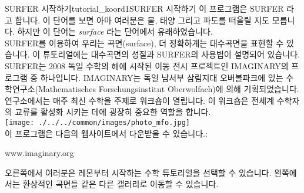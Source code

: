\begin{surferIntroPage}{SURFER 시작하기}{tutorial_koord1}{SURFER 시작하기}
이 프로그램은 SURFER 라고 합니다. 이 단어를 보면 아마 여러분은 물, 태양 그리고 파도를 떠올릴 지도 모릅니다. 하지만 이 단어는 {\it surface} 라는 단어에서 유래하였습니다.
\\
SURFER를 이용하여 우리는 곡면(surface), 더 정확하게는 대수곡면을 표현할 수 있습니다. 
이 튜토리얼에는 대수곡면의 성질과 SURFER의 사용법이 설명되어 있습니다.\\
SURFER는 2008 독일 수학의 해에 시작된 이동 전시 프로젝트인 IMAGINARY의 프로그램 중 하나입니다. IMAGINARY는 독일 남서부 삼림지대 오버볼파크에 있는 수학연구소(Mathematisches Forschungsinstitut Oberwolfach)에 의해 기획되었습니다. 연구소에서는 매주 최신 수학을 주제로 워크숍이 열립니다. 이 워크숍은 전세계 수학자의 교류를 활성화 시키는 데에 굉장히 중요한 역할을 합니다.\\
\vspace{0.2cm} \hspace{3.5cm}\texttt{[image: ./../../common/images/photo\_mfo.jpg]}\\
이 프로그램은 다음의 웹사이트에서 다운받을 수 있습니다.: \\
\begin{centering}
www.imaginary.org\\
\end{centering}
 \vspace{0.2cm}
오른쪽에서 여러분은 레몬부터 시작하는 수학 튜토리얼을 선택할 수 있습니다. 왼쪽에서는 환상적인 곡면들 같은 다른 갤러리로 이동할 수 있습니다.
\end{surferIntroPage}
